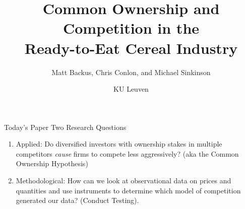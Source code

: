 \title{Common Ownership and Competition in the\\
 Ready-to-Eat Cereal Industry}
\author{Matt Backus, Chris Conlon, and Michael Sinkinson}

\date{KU Leuven}








\begin{frame}[plain] %
\titlepage
\end{frame}




\begin{frame}[plain]{Today's Paper}
Two Research Questions
\begin{enumerate}
\item Applied: Do diversified investors with ownership stakes in multiple competitors \textit{cause} firms to compete less aggressively? (aka the \alert{Common Ownership Hypothesis})
\item Methodological: How can we look at observational data on prices and quantities and use instruments to determine which model of competition generated our data? (\alert{Conduct Testing}).
\end{enumerate}
\end{frame}







